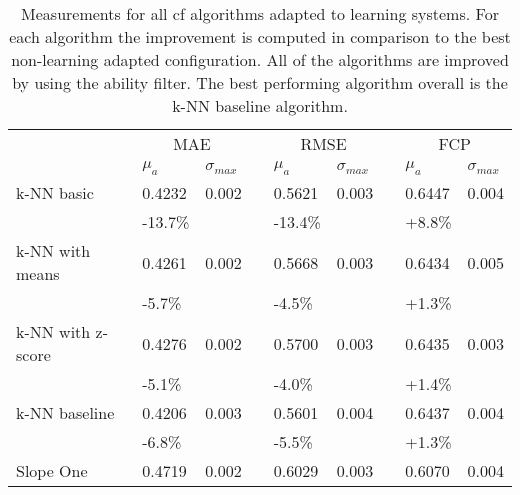 \begin{sidewaystable}
    
    \centering
    \caption[Adapted collaborative filtering algorithms]{Measurements for all \gls{cf} algorithms adapted to learning systems. For each algorithm the improvement is computed in comparison to the best non-learning adapted configuration. All of the algorithms are improved by using the ability filter. The best performing algorithm overall is the k-NN baseline algorithm.}
    \small
    \begin{tabular}{l ll l ll l ll}
                 & \multicolumn{2}{c}{MAE} &&
                 \multicolumn{2}{c}{RMSE} &&
                 \multicolumn{2}{c}{FCP} \\
    \cline{2-3} \cline{5-6} \cline{8-9}
    & $\mu_a$ & $\sigma_{max}$ && $\mu_a$ & $\sigma_{max}$ && $\mu_a$ & $\sigma_{max}$ \\
    \hline
    k-NN basic & 0.4232 & 0.002 && 0.5621 & 0.003 && 0.6447 & 0.004 \\
                  & \textcolor{scw-teal-darker}{-13.7\%} &&& \textcolor{scw-teal-darker}{-13.4\%}
                          &&& \textcolor{scw-teal-darker}{+8.8\%} \\
    k-NN with means  & 0.4261 & 0.002 && 0.5668 & 0.003 && 0.6434 & 0.005\\
                  & \textcolor{scw-teal-darker}{-5.7\%} &&& \textcolor{scw-teal-darker}{-4.5\%}
                          &&& \textcolor{scw-teal-darker}{+1.3\%} \\
    k-NN with z-score  & 0.4276 & 0.002 && 0.5700 & 0.003 && 0.6435 & 0.003\\
                  & \textcolor{scw-teal-darker}{-5.1\%} &&& \textcolor{scw-teal-darker}{-4.0\%}
                          &&& \textcolor{scw-teal-darker}{+1.4\%} \\
    k-NN baseline & \textcolor{scw-teal-darker}{0.4206} & 0.003 && 0.5601 & 0.004 && 0.6437 & 0.004\\
              & \textcolor{scw-teal-darker}{-6.8\%} &&& \textcolor{scw-teal-darker}{-5.5\%}
                      &&& \textcolor{scw-teal-darker}{+1.3\%} \\
    Slope One     & 0.4719 & 0.002 && 0.6029 & 0.003 && 0.6070 & 0.004 \\

\end{tabular}
\end{sidewaystable}
